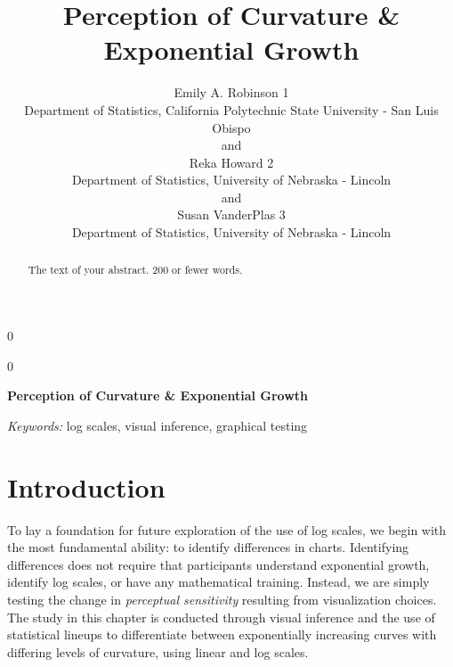 \documentclass[12pt]{article}
\newcommand{\blind}{0}
\begin{document}
\def\spacingset#1{\renewcommand{\baselinestretch}%
{#1}\small\normalsize} \spacingset{1}



\blind
{
  \title{\bf Perception of Curvature \& Exponential Growth}

  \author{
        Emily A. Robinson 1 \\
    Department of Statistics, California Polytechnic State University -
San Luis Obispo\\
     and \\     Reka Howard 2 \\
    Department of Statistics, University of Nebraska - Lincoln\\
     and \\     Susan VanderPlas 3 \\
    Department of Statistics, University of Nebraska - Lincoln\\
      }
  \maketitle
} \fi

\blind
{
  \bigskip
  \bigskip
  \bigskip
  \begin{center}
    {\LARGE\bf Perception of Curvature \& Exponential Growth}
  \end{center}
  \medskip
} \fi

\bigskip
\begin{abstract}
The text of your abstract. 200 or fewer words.
\end{abstract}

\noindent%
{\it Keywords:} log scales, visual inference, graphical testing
\vfill

\newpage
\spacingset{1.45} %

\hypertarget{introduction}{%
\section{Introduction}\label{introduction}}

To lay a foundation for future exploration of the use of log scales, we
begin with the most fundamental ability: to identify differences in
charts. Identifying differences does not require that participants
understand exponential growth, identify log scales, or have any
mathematical training. Instead, we are simply testing the change in
\emph{perceptual sensitivity} resulting from visualization choices. The
study in this chapter is conducted through visual inference and the use
of statistical lineups \citep{buja_statistical_2009} to differentiate
between exponentially increasing curves with differing levels of
curvature, using linear and log scales.
\end{document}
